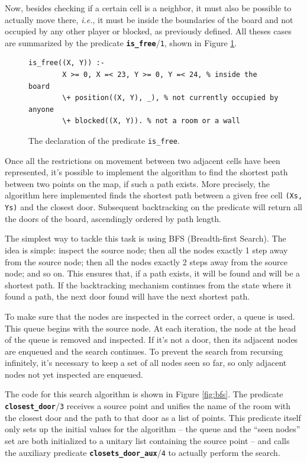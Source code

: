 \documentclass[12pt,a4paper]{article}
\newcommand{\varname}[1]{\texttt{#1}}
\newcommand{\varnamebf}[1]{\textbf{\texttt{#1}}}
\newcommand{\predprot}[2]{{\color{MidnightBlue}\varnamebf{#1}}/{\color{Mulberry}\varname{#2}}}
\newcommand{\predname}[1]{{\color{MidnightBlue}\varname{#1}}}
\begin{document}
Now, besides checking if a certain cell is a neighbor, it must also be possible to actually move there, \textit{i.e.}, it must be inside the boundaries of the board and not occupied by any other player or blocked, as previously defined. All theses cases are summarized by the predicate \predprot{is\_free}{1}, shown in Figure \ref{fig:is-free}.

\begin{figure}[H]
	\centering
\begin{lstlisting}[style=Prolog-pygsty]
%% is_free((X, Y)) - the position <X, Y> can bee occupied by a character.
is_free((X, Y)) :-
		X >= 0, X =< 23, Y >= 0, Y =< 24, % inside the board
		\+ position((X, Y), _), % not currently occupied by anyone
		\+ blocked((X, Y)). % not a room or a wall
\end{lstlisting}
	\caption{The declaration of the predicate \predname{is\_free}.} 
	\label{fig:is-free}
\end{figure}

Once all the restrictions on movement between two adjacent cells have been represented, it's possible to implement the algorithm to find the shortest path between two points on the map, if such a path exists. More precisely, the algorithm here implemented finds the shortest path between a given free cell \varname{(Xs, Ys)} and the closest door. Subsequent backtracking on the predicate will return all the doors of the board, ascendingly ordered by path length.

The simplest way to tackle this task is using BFS (Breadth-first Search). The idea is simple: inspect the source node; then all the nodes exactly 1 step away from the source node; then all the nodes exactly 2 steps away from the source node; and so on. This ensures that, if a path exists, it will be found and will be a shortest path. If the backtracking mechanism continues from the state where it found a path, the next door found will have the next shortest path.

To make sure that the nodes are inspected in the correct order, a queue is used. This queue begins with the source node. At each iteration, the node at the head of the queue is removed and inspected. If it's not a door, then its adjacent nodes are enqueued and the search continues. To prevent the search from recursing infinitely, it's necessary to keep a set of all nodes seen so far, so only adjacent nodes not yet inspected are enqueued.

The code for this search algorithm is shown in Figure \ref{fig:bfs}. The predicate \predprot{closest\_door}{3} receives a source point and unifies the name of the room with the closest door and the path to that door as a list of points. This predicate itself only sets up the initial values for the algorithm -- the queue and the ``seen nodes'' set are both initialized to a unitary list containing the source point -- and calls the auxiliary predicate \predprot{closets\_door\_aux}{4} to actually perform the search.
\end{document}
